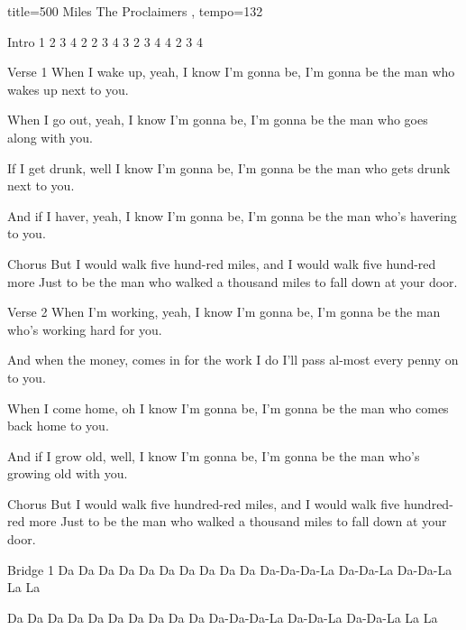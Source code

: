 \begin{song}{
	title={500 Miles The Proclaimers}
,	tempo={132}
}

Intro
 1 2 3 4     2 2 3 4     3 2 3 4     4 2 3 4

Verse 1
When I wake up, yeah, I know I'm gonna be,
I'm gonna be the man who wakes up next to you.

When I go out, yeah, I know I'm gonna be,
I'm gonna be the man who goes along with you.

If I get drunk, well I know I'm gonna be,
I'm gonna be the man who gets drunk next to you.

And if I haver, yeah, I know I'm gonna be,
I'm gonna be the man who's havering to you.

Chorus
But I would walk  five hund-red miles, and
I    would     walk    five hund-red    more
Just to be the man who walked a thousand miles
to fall down at your door.    


Verse 2
When I'm working, yeah, I know I'm gonna be,
I'm gonna be the man who's working hard for you.

And when the money,    comes in for the work I do
I'll pass al-most every penny on to you.

When I come home, oh I know I'm gonna be,
I'm gonna be the man who comes back home to you.

And if I grow old, well, I know I'm gonna be,
I'm gonna be the man who's growing old with you.


Chorus
But I would walk five hundred-red miles, and
I would walk five hundred-red more
Just to be the man who walked a thousand miles
to fall down at your door.    



Bridge 1
Da Da Da Da          Da Da Da Da      Da Da Da-Da-Da-La Da-Da-La Da-Da-La La La

Da Da Da Da           Da Da Da Da      Da Da Da-Da-Da-La Da-Da-La Da-Da-La La La




\end{song}
